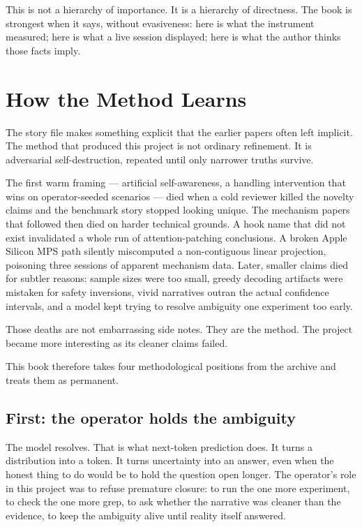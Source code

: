 \documentclass[11pt,oneside]{book}
\begin{document}
This is not a hierarchy of importance. It is a hierarchy of directness. The book is strongest when it says, without evasiveness: here is what the instrument measured; here is what a live session displayed; here is what the author thinks those facts imply.

\chapter{How the Method Learns}
The story file makes something explicit that the earlier papers often left implicit. The method that produced this project is not ordinary refinement. It is adversarial self-destruction, repeated until only narrower truths survive.

The first warm framing --- artificial self-awareness, a handling intervention that wins on operator-seeded scenarios --- died when a cold reviewer killed the novelty claims and the benchmark story stopped looking unique. The mechanism papers that followed then died on harder technical grounds. A hook name that did not exist invalidated a whole run of attention-patching conclusions. A broken Apple Silicon MPS path silently miscomputed a non-contiguous linear projection, poisoning three sessions of apparent mechanism data. Later, smaller claims died for subtler reasons: sample sizes were too small, greedy decoding artifacts were mistaken for safety inversions, vivid narratives outran the actual confidence intervals, and a model kept trying to resolve ambiguity one experiment too early.

Those deaths are not embarrassing side notes. They are the method. The project became more interesting as its cleaner claims failed.

This book therefore takes four methodological positions from the archive and treats them as permanent.

\section{First: the operator holds the ambiguity}
The model resolves. That is what next-token prediction does. It turns a distribution into a token. It turns uncertainty into an answer, even when the honest thing to do would be to hold the question open longer. The operator's role in this project was to refuse premature closure: to run the one more experiment, to check the one more grep, to ask whether the narrative was cleaner than the evidence, to keep the ambiguity alive until reality itself answered.
\end{document}
